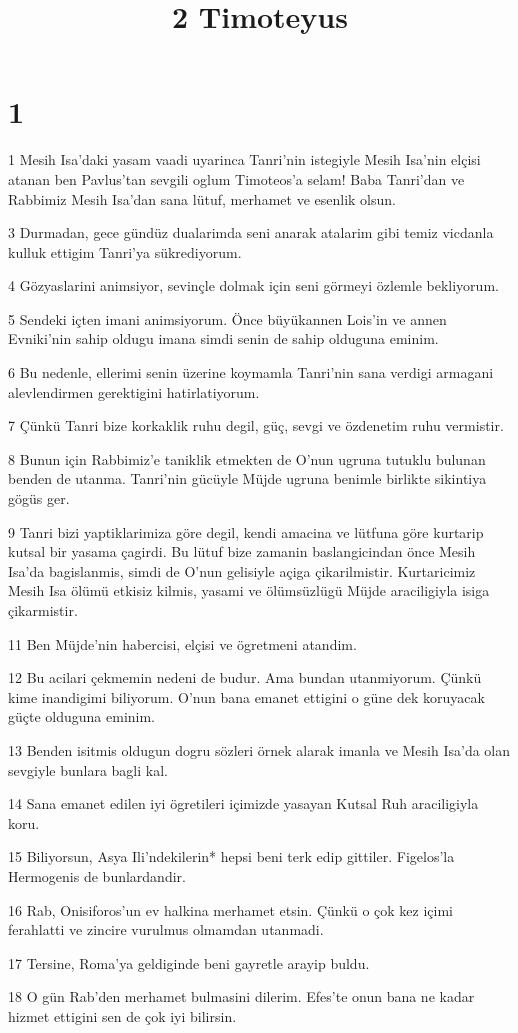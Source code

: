 

\title{2 Timoteyus}


\chapter{1}

\par 1 Mesih Isa'daki yasam vaadi uyarinca Tanri'nin istegiyle Mesih Isa'nin elçisi atanan ben Pavlus'tan sevgili oglum Timoteos'a selam! Baba Tanri'dan ve Rabbimiz Mesih Isa'dan sana lütuf, merhamet ve esenlik olsun.
\par 3 Durmadan, gece gündüz dualarimda seni anarak atalarim gibi temiz vicdanla kulluk ettigim Tanri'ya sükrediyorum.
\par 4 Gözyaslarini animsiyor, sevinçle dolmak için seni görmeyi özlemle bekliyorum.
\par 5 Sendeki içten imani animsiyorum. Önce büyükannen Lois'in ve annen Evniki'nin sahip oldugu imana simdi senin de sahip olduguna eminim.
\par 6 Bu nedenle, ellerimi senin üzerine koymamla Tanri'nin sana verdigi armagani alevlendirmen gerektigini hatirlatiyorum.
\par 7 Çünkü Tanri bize korkaklik ruhu degil, güç, sevgi ve özdenetim ruhu vermistir.
\par 8 Bunun için Rabbimiz'e taniklik etmekten de O'nun ugruna tutuklu bulunan benden de utanma. Tanri'nin gücüyle Müjde ugruna benimle birlikte sikintiya gögüs ger.
\par 9 Tanri bizi yaptiklarimiza göre degil, kendi amacina ve lütfuna göre kurtarip kutsal bir yasama çagirdi. Bu lütuf bize zamanin baslangicindan önce Mesih Isa'da bagislanmis, simdi de O'nun gelisiyle açiga çikarilmistir. Kurtaricimiz Mesih Isa ölümü etkisiz kilmis, yasami ve ölümsüzlügü Müjde araciligiyla isiga çikarmistir.
\par 11 Ben Müjde'nin habercisi, elçisi ve ögretmeni atandim.
\par 12 Bu acilari çekmemin nedeni de budur. Ama bundan utanmiyorum. Çünkü kime inandigimi biliyorum. O'nun bana emanet ettigini o güne dek koruyacak güçte olduguna eminim.
\par 13 Benden isitmis oldugun dogru sözleri örnek alarak imanla ve Mesih Isa'da olan sevgiyle bunlara bagli kal.
\par 14 Sana emanet edilen iyi ögretileri içimizde yasayan Kutsal Ruh araciligiyla koru.
\par 15 Biliyorsun, Asya Ili'ndekilerin* hepsi beni terk edip gittiler. Figelos'la Hermogenis de bunlardandir.
\par 16 Rab, Onisiforos'un ev halkina merhamet etsin. Çünkü o çok kez içimi ferahlatti ve zincire vurulmus olmamdan utanmadi.
\par 17 Tersine, Roma'ya geldiginde beni gayretle arayip buldu.
\par 18 O gün Rab'den merhamet bulmasini dilerim. Efes'te onun bana ne kadar hizmet ettigini sen de çok iyi bilirsin.

